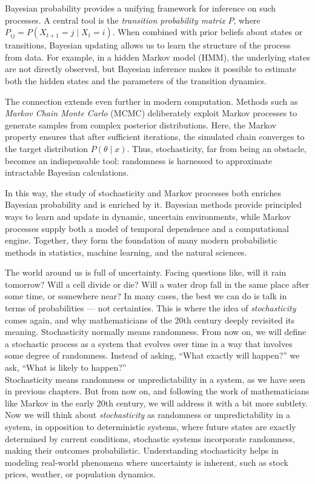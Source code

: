 \documentclass{book}
\begin{document}
Bayesian probability provides a unifying framework for inference on such processes. A central tool is the \textit{transition probability matrix} $P$, where $P_{ij} = P(X_{t+1} = j \mid X_t = i)$. When combined with prior beliefs about states or transitions, Bayesian updating allows us to learn the structure of the process from data. For example, in a hidden Markov model (HMM), the underlying states are not directly observed, but Bayesian inference makes it possible to estimate both the hidden states and the parameters of the transition dynamics.

The connection extends even further in modern computation. Methods such as \textit{Markov Chain Monte Carlo} (MCMC) deliberately exploit Markov processes to generate samples from complex posterior distributions. Here, the Markov property ensures that after sufficient iterations, the simulated chain converges to the target distribution $P(\theta \mid x)$. Thus, stochasticity, far from being an obstacle, becomes an indispensable tool: randomness is harnessed to approximate intractable Bayesian calculations.

In this way, the study of stochasticity and Markov processes both enriches Bayesian probability and is enriched by it. Bayesian methods provide principled ways to learn and update in dynamic, uncertain environments, while Markov processes supply both a model of temporal dependence and a computational engine. Together, they form the foundation of many modern probabilistic methods in statistics, machine learning, and the natural sciences.

\newpage

The world around us is full of uncertainty. Facing questions like, will it rain tomorrow? Will a cell divide or die? Will a water drop fall in the same place after some time, or somewhere near? In many cases, the best we can do is talk in terms of probabilities — not certainties. This is where the idea of \textit{stochasticity} comes again, and why mathematicians of the 20th century deeply revisited its meaning. Stochasticity normally means randomness. From now on, we will define a stochastic process as a system that evolves over time in a way that involves some degree of randomness. Instead of asking, “What exactly will happen?” we ask, “What is likely to happen?”\\

Stochasticity means randomness or unpredictability in a system, as we have seen in previous chapters. But from now on, and following the work of mathematicians like Markov in the early 20th century, we will address it with a bit more subtlety. Now we will think about \textit{stochasticity} as randomness or unpredictability in a system, in opposition to deterministic systems, where future states are exactly determined by current conditions, stochastic systems incorporate randomness, making their outcomes probabilistic. Understanding stochasticity helps in modeling real-world phenomena where uncertainty is inherent, such as stock prices, weather, or population dynamics.\\
\end{document}
